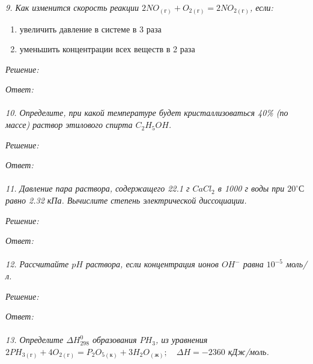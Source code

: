 
\emph{9. Как изменится скорость реакции 
\( 2NO_{(\text{г})} + O_{2(\text{г})} = 2NO_{2(\text{г})} \), если:}
\begin{enumerate}
    \item увеличить давление в системе в 3 раза
    \item уменьшить концентрации всех веществ в 2 раза
\end{enumerate}

\emph{Решение:}

\emph{Ответ: } \\\\


\emph{10. Определите, при какой температуре будет кристаллизоваться 40\% 
(по массе) раствор этилового спирта \( C_2H_5OH \).}

\emph{Решение:}

\emph{Ответ: } \\\\


\emph{11. Давление пара раствора, содержащего 22.1 г \( CaCl_2 \) в 
1000 г воды при \( 20 ^{\circ}С \) равно 2.32 кПа. Вычислите степень 
электрической диссоциации.}

\emph{Решение:}

\emph{Ответ: } \\\\


\emph{12. Рассчитайте \( pH \) раствора, если концентрация ионов 
\( OH^{-} \) равна \( 10^{-5} \) моль/л.}

\emph{Решение:}

\emph{Ответ: } \\\\


\emph{13. Определите \( \Delta H^{0}_{298} \) образования \( PH_3\), 
из уравнения 
\(
    2PH_{3(\text{г})} + 4O_{2(\text{г})} = 
    P_2 O_{5(\text{к})} + 3H_2 O_{(\text{ж})};\quad
    \Delta H = -2360 
\) кДж/моль.}

